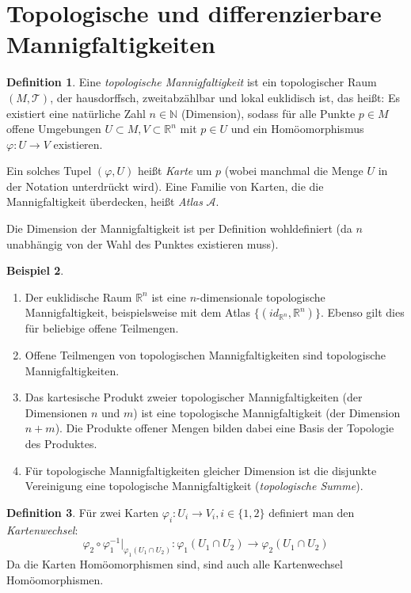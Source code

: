 \documentclass[a4paper]{scrbook}
\numberwithin{equation}{chapter}
\newcommand{\R}{\mathbb{R}}
\theoremstyle{definition}
\newtheorem{defn}{Definition}[section]
\newtheorem{bsp}[defn]{Beispiel}
\begin{document}
	\section{Topologische und differenzierbare Mannigfaltigkeiten}
		\begin{defn}
			Eine \emph{topologische Mannigfaltigkeit} ist ein topologischer Raum $(M,\mathcal{T})$, der hausdorffsch, zweitabzählbar und lokal euklidisch ist, das heißt:
			Es existiert eine natürliche Zahl $n\in \mathbb{N}$ (Dimension), sodass für alle Punkte $p\in M$ offene Umgebungen $U\subset M, V\subset \R^n$ mit $p\in U $ und ein Homöomorphismus $ \varphi\colon U\rightarrow V$ existieren.

			Ein solches Tupel $(\varphi,U)$ heißt \emph{Karte} um $p$ (wobei manchmal die Menge $U$ in der Notation unterdrückt wird). Eine Familie von Karten, die die Mannigfaltigkeit überdecken, heißt \emph{Atlas} $\mathcal{A}$.

			Die Dimension der Mannigfaltigkeit ist per Definition wohldefiniert (da $n$ unabhängig von der Wahl des Punktes existieren muss).
		\end{defn}
		\begin{bsp}\hfill 
			\begin{enumerate}[label=(\alph*)]
				\item Der euklidische Raum $\R^n$ ist eine $n$-dimensionale topologische Mannigfaltigkeit, beispielsweise mit dem Atlas $\lbrace (id_{\R^n},\R^n)\rbrace$. Ebenso gilt dies für beliebige offene Teilmengen.
				\item Offene Teilmengen von topologischen Mannigfaltigkeiten sind topologische Mannigfaltigkeiten.
				\item Das kartesische Produkt zweier topologischer Mannigfaltigkeiten (der Dimensionen $n$ und $m$) ist eine topologische Mannigfaltigkeit (der Dimension $n + m$). Die Produkte offener Mengen bilden dabei eine Basis der Topologie des Produktes.
				\item Für topologische Mannigfaltigkeiten gleicher Dimension ist die disjunkte Vereinigung eine topologische Mannigfaltigkeit (\emph{topologische Summe}).
			\end{enumerate}
		\end{bsp}
		\begin{defn}
			Für zwei Karten $\varphi_i\colon U_i\rightarrow V_i, i\in\lbrace 1,2 \rbrace$ definiert man den \emph{Kartenwechsel}:
			\begin{equation*}
				\varphi_2\circ\varphi_1^{-1}\vert_{\varphi_1(U_1\cap U_2)}\colon \varphi_1(U_1\cap U_2)\rightarrow \varphi_2(U_1\cap U_2)
			\end{equation*}
			Da die Karten Homöomorphismen sind, sind auch alle Kartenwechsel Homöomorphismen.
		\end{defn} 
\end{document}
